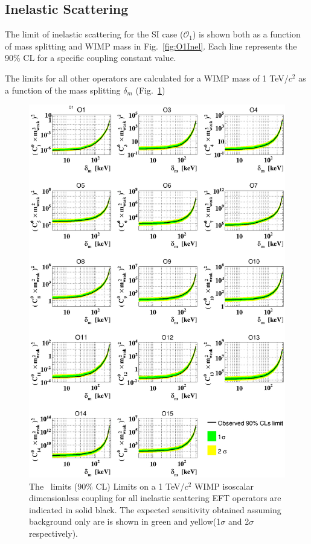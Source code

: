 \subsection{Inelastic Scattering}
The limit of inelastic scattering for the SI case ($\mathcal{O}_1$) is shown both as a function of mass splitting and WIMP mass in Fig.~\ref{fig:O1Inel}. Each line represents the 90\% CL for a specific coupling constant value. 

The limits for all other operators are calculated for a WIMP mass of 1 TeV/$c^2$ as a function of the mass splitting $\delta_m$ (Fig.~\ref{fig:InelasticLimit}) 



\begin{figure}
\begin{minipage}{1.\linewidth}
\centerline{\includegraphics[width=\textwidth,height=\textheight,keepaspectratio]{Figures/FinalInelastic.eps}}
\end{minipage}
\caption{The \Xehund\ limits (90\% CL) Limits on a 1 TeV/$c^2$ WIMP isoscalar dimensionless coupling for all inelastic scattering EFT operators are indicated in solid black. The expected sensitivity obtained assuming background only are is shown in green and yellow(1$\sigma$ and 2$\sigma$ respectively). }
\label{fig:InelasticLimit}
\end{figure}


